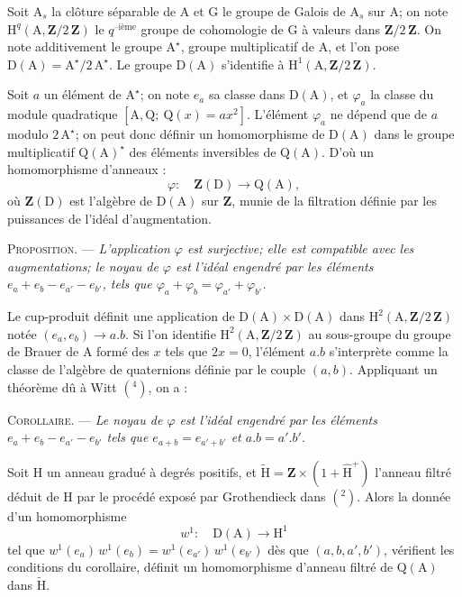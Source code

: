 Soit $\mathrm A_{s}$ la clôture séparable de $\mathrm A$ et $\mathrm G$ le groupe de Galois de $\mathrm A_{s}$ sur $\mathrm A$; on note $\mathrm H^{q}(\mathrm A,\mathbf Z/2\,\mathbf Z)$ le $q^{\text{--ième}}$ groupe de cohomologie de $\mathrm G$ à valeurs dans $\mathbf Z/2\,\mathbf Z$. On note additivement le groupe $\mathrm A^{\star}$, groupe multiplicatif de $\mathrm A$, et l'on pose $\mathrm D(\mathrm A)=\mathrm A^{\star}/2\,\mathrm A^{\star}$. Le groupe $\mathrm D(\mathrm A)$ s'identifie à $\mathrm H^{1}(\mathrm A,\mathbf Z/2\,\mathbf Z)$.

Soit $a$ un élément de $\mathrm A^{\star}$; on note $e_{a}$ sa classe dans $\mathrm D(\mathrm A)$, et $\varphi_{a}$ la classe du module quadratique $[\mathrm A,\mathrm Q;\ \mathrm Q(x)=ax^{2}]$. L'élément $\varphi_{a}$ ne dépend que de $a$ modulo $2\,\mathrm A^{\star}$; on peut donc définir un homomorphisme de $\mathrm D(\mathrm A)$ dans le groupe multiplicatif $\mathrm Q(\mathrm A)^{\star}$ des éléments inversibles de $\mathrm Q(\mathrm A)$. D'où un homomorphisme d'anneaux :
\[
\varphi:\quad \mathbf Z(\mathrm D)\to\mathrm Q(\mathrm A),
\]
où $\mathbf Z(\mathrm D)$ est l'algèbre de $\mathrm D(\mathrm A)$ sur $\mathbf Z$, munie de la filtration définie par les puissances de l'idéal d'augmentation.

\textsc{Proposition}. --- \emph{L'application $\varphi$ est surjective; elle est compatible avec les augmentations; le noyau de $\varphi$ est l'idéal engendré par les éléments $e_{a}+e_{b}-e_{a'}-e_{b'}$, tels que $\varphi_{a}+\varphi_{b}=\varphi_{a'}+\varphi_{b'}$.}

Le cup-produit définit une application de $\mathrm D(\mathrm A)\times\mathrm D(\mathrm A)$ dans $\mathrm H^{2}(\mathrm A,\mathbf Z/2\,\mathbf Z)$ notée $(e_{a},e_{b})\to a.b$. Si l'on identifie $\mathrm H^{2}(\mathrm A,\mathbf Z/2\,\mathbf Z)$ au sous-groupe du groupe de Brauer de $\mathrm A$ formé des $x$ tels que $2x=0$, l'élément $a.b$
s'interprète comme la classe de l'algèbre de quaternions définie par le couple $(a,b)$. Appliquant un théorème dû à Witt $(^{4})$, on a :

\textsc{Corollaire}. --- \emph{Le noyau de $\varphi$ est l'idéal engendré par les éléments $e_{a}+e_{b}-e_{a'}-e_{b'}$ tels que $e_{a+b}=e_{a'+b'}$ et $a.b=a'.b'$.}

Soit $\mathrm H$ un anneau gradué à degrés positifs, et $\widetilde{\mathrm H}=\mathbf Z\times(1+\widehat{\mathrm H}^{+})$ l'anneau filtré déduit de $\mathrm H$ par le procédé exposé par Grothendieck dans $(^{2})$. Alors la donnée d'un homomorphisme
\[
w^{1}:\quad\mathrm D(\mathrm A)\to\mathrm H^{1}
\]
tel que $w^{1}(e_{a})\,w^{1}(e_{b})=w^{1}(e_{a'})\,w^{1}(e_{b'})$ dès que $(a,b,a',b')$, vérifient les conditions du corollaire, définit un homomorphisme d'anneau filtré de $\mathrm Q(\mathrm A)$ dans $\widetilde{\mathrm H}$.

